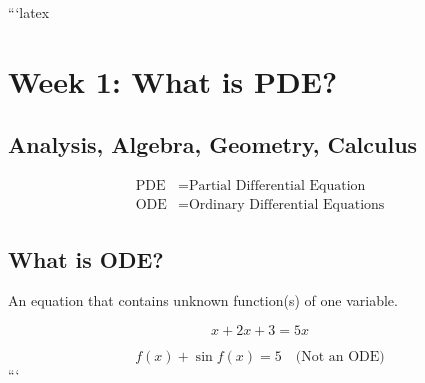 ```latex
\section*{Week 1: What is PDE?}

\subsection*{Analysis, Algebra, Geometry, Calculus}

\begin{align*}
    \text{PDE} &= \text{Partial Differential Equation} \\
    \text{ODE} &= \text{Ordinary Differential Equations}
\end{align*}

\subsection*{What is ODE?}

An equation that contains unknown function(s) of one variable.

\begin{equation}
    x + 2x + 3 = 5x
\end{equation}

\begin{equation}
    f(x) + \sin f(x) = 5 \quad \text{(Not an ODE)}
\end{equation}
```
